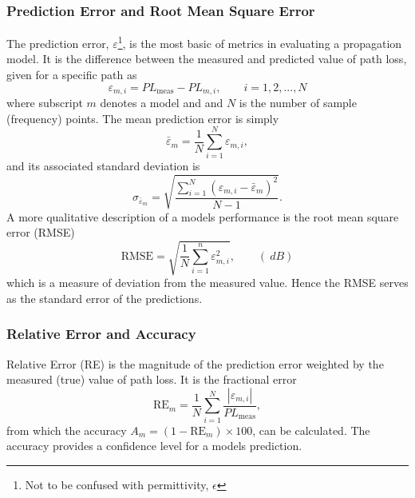 \documentclass[10pt,journal,twoside]{IEEEtran}
\begin{document}
\subsubsection{Prediction Error and Root Mean Square Error}
The prediction error, $\varepsilon$\footnote{Not to be confused with permittivity, $\epsilon$}, is the most basic of metrics in evaluating a propagation  model. It is the difference between the measured %
and predicted value of path loss, given for a specific path as
\begin{equation}
	\label{eq:pred_error1}
	\varepsilon_{m,i}  = PL_{\text{meas}} - PL_{m,i}, \qquad i = 1,2,...,N
\end{equation}
where subscript $m$ denotes a model and and $N$ is the number of sample (frequency) points. %
The mean prediction error is simply
\begin{equation}
\bar\varepsilon_m  = \dfrac{1}{N}\sum_{i=1}^{N}\varepsilon_{m,i},
\end{equation}
and its associated standard deviation is 
\begin{equation}
\sigma_{\bar\varepsilon_m} = \sqrt{ \dfrac{\sum_{i=1}^{N} \left( \varepsilon_{m,i} - \bar\varepsilon_m \right)^2}{N-1} }.
\end{equation}
A more qualitative description of a models performance is the root mean square error (RMSE)
\begin{equation}
	\label{eq:rmse}
	\text{RMSE} = \sqrt{\dfrac{1}{N}\sum\limits_{i=1}^n \varepsilon_{m,i}^2}, \qquad (\SI{}{dB})
\end{equation}
which is a measure of deviation from the measured value. Hence the RMSE serves as the standard error of the predictions. 
%
\subsubsection{Relative Error and Accuracy}
Relative Error (RE) is the magnitude of the prediction error weighted by the measured (true) value of path loss. It is the fractional error
\begin{equation}
	\text{RE}_m = \dfrac{1}{N}\sum_{i=1}^{N}\dfrac{\left|\varepsilon_{m,i}\right|} {PL_{\text{meas}}},
\end{equation}
from which the accuracy $A_m = (1 - \text{RE}_m)\times 100$, can be calculated. The accuracy provides a confidence level for a models prediction.
%
\end{document}
